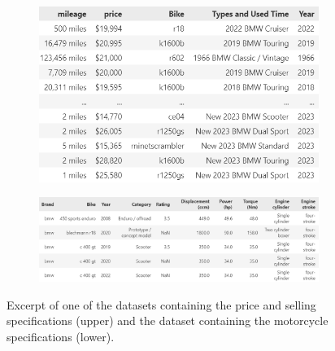 \begin{figure}
    \centering
    \begin{subfigure}[h]{\textwidth}
        \centering
        \includegraphics[width=\textwidth]{"content/pics/df_bmw_raw.png"}
    \end{subfigure}
    \vfill
    \begin{subfigure}[h]{\textwidth}
        \centering
        \includegraphics[width=\textwidth]{"content/pics/df_bikez_raw.png"}
    \end{subfigure}
    \caption{Excerpt of one of the datasets containing the price and selling specifications (upper) and the dataset
    containing the motorcycle specifications (lower).}
    \label{fig:Bike_Tables_raw}
\end{figure}

